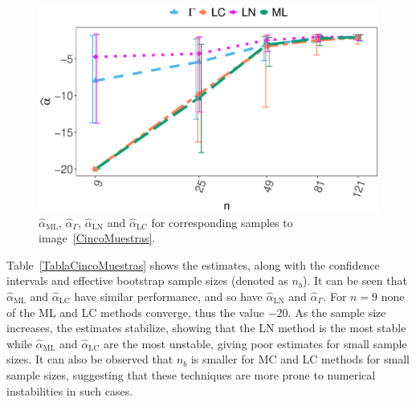 \documentclass[twocolumn]{svjour3}
\begin{document}
	\begin{figure}[hbt]
		\centering
		\includegraphics[width=\linewidth]{AlfaVsTamCincoMuestrasCorregido_v2.eps}
		\caption{ $\widehat{\alpha}_{\text{{ML}}}$, $\widehat{\alpha}_{\Gamma}$, $\widehat{\alpha}_{\text{{LN}}}$ and $\widehat{\alpha}_{\text{{LC}}}$ for corresponding samples to image~\ref{CincoMuestras}.}\label{AlfaVsTamCincoMuestras}
	\end{figure}
	
	Table~\ref{TablaCincoMuestras} shows the estimates, along with the confidence intervals and effective bootstrap sample sizes (denoted as $n_b$).
	It can be seen that $\widehat{\alpha}_{\text{{ML}}}$ and $\widehat{\alpha}_{\text{{LC}}}$ have similar performance, and so have $\widehat{\alpha}_{\text{{LN}}}$ and $\widehat{\alpha}_{\Gamma}$. 
	For $n= 9$ none of the ML and LC methods converge, thus the value $-20$. 
	As the sample size increases, the estimates stabilize, showing that the LN method is the most stable while $\widehat{\alpha}_{\text{{ML}}}$ and $\widehat{\alpha}_{\text{{LC}}}$ are the most unstable, giving poor estimates for small sample sizes.
	It can also be observed that $n_b$ is smaller for MC and LC methods for small sample sizes, suggesting that these techniques are more prone to numerical instabilities in such cases.
	
\end{document}
